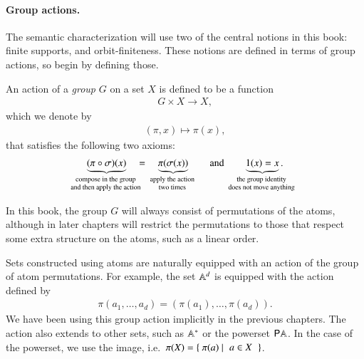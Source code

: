 \paragraph*{Group actions.}
The semantic characterization will use two of the central notions in this book: finite supports, and orbit-finiteness. These notions are defined in terms of group actions, so begin by defining those. 





\begin{definition}\label{def:group-action}
    An action of a \emph{group} $G$ on a set $X$ is defined to be a function 
    \begin{align*}
     G \times X \to X,
    \end{align*}
    which we denote by
    \begin{align*}
    (\pi,x) \mapsto \pi(x),
    \end{align*}
    that satisfies the following two axioms: 
    \begin{align*}
    \myunderbrace{(\pi \circ \sigma)(x)}{compose in the group\\ and then apply the action} \quad = \quad \myunderbrace{\pi(\sigma(x))}{apply the action \\ two times} 
    \qquad \text{and} \qquad 
    \myunderbrace{1(x)=x}{the group identity\\ does not move anything}.
    \end{align*}
\end{definition}

In this book, the group $G$ will always consist of  permutations of the atoms, although in later chapters will restrict the permutations to those that respect some extra structure on the atoms, such as a linear order.

\begin{myexample}
    Sets constructed using atoms are naturally equipped with an action  of the group of atom permutations. For example, the set $\mathbb A^d$ is equipped with the action defined by 
    \begin{align*}
    \pi(a_1,\ldots,a_d) = (\pi(a_1),\ldots,\pi(a_d)).
    \end{align*}
    We have been using this group action implicitly in the previous chapters. The action also extends to other sets, such as $\mathbb A^*$ or the powerset ${\mathsf P} \mathbb A$. In the case of the powerset, we use the image, i.e.~$
    \pi(X) = \setbuild{\pi(a)}{$a \in X$}$.
\end{myexample}

